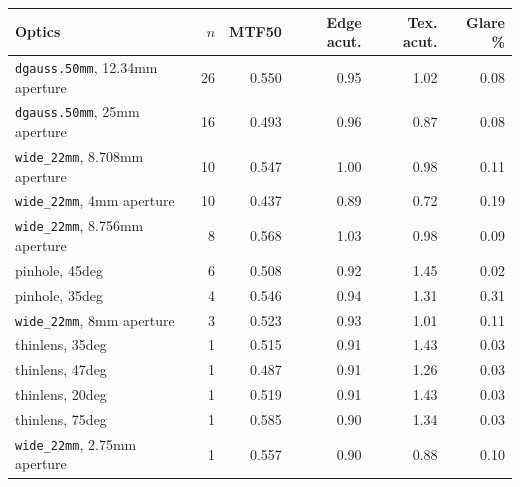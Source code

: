 \begin{tabular}{@{}lrrrrr@{}}
\toprule
Optics & $n$ & MTF50 & Edge acut. & Tex. acut. & Glare \% \\
\midrule
\texttt{dgauss.50mm}, 12.34mm aperture & 26 & 0.550 & 0.95 & 1.02 & 0.08 \\
\texttt{dgauss.50mm}, 25mm aperture & 16 & 0.493 & 0.96 & 0.87 & 0.08 \\
\texttt{wide\_22mm}, 8.708mm aperture & 10 & 0.547 & 1.00 & 0.98 & 0.11 \\
\texttt{wide\_22mm}, 4mm aperture & 10 & 0.437 & 0.89 & 0.72 & 0.19 \\
\texttt{wide\_22mm}, 8.756mm aperture & 8 & 0.568 & 1.03 & 0.98 & 0.09 \\
pinhole, 45deg & 6 & 0.508 & 0.92 & 1.45 & 0.02 \\
pinhole, 35deg & 4 & 0.546 & 0.94 & 1.31 & 0.31 \\
\texttt{wide\_22mm}, 8mm aperture & 3 & 0.523 & 0.93 & 1.01 & 0.11 \\
thinlens, 35deg & 1 & 0.515 & 0.91 & 1.43 & 0.03 \\
thinlens, 47deg & 1 & 0.487 & 0.91 & 1.26 & 0.03 \\
thinlens, 20deg & 1 & 0.519 & 0.91 & 1.43 & 0.03 \\
thinlens, 75deg & 1 & 0.585 & 0.90 & 1.34 & 0.03 \\
\texttt{wide\_22mm}, 2.75mm aperture & 1 & 0.557 & 0.90 & 0.88 & 0.10 \\
\bottomrule
\end{tabular}
